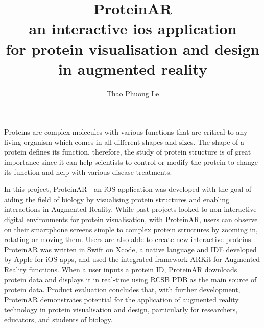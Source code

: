\documentclass[MSCIM]{mscim}
\begin{document}

\title{\textbf{ProteinAR} \\an interactive ios application\\for protein visualisation and design in augmented reality}

\author{Thao Phuong Le}

\beforeabstract

Proteins are complex molecules with various functions that are critical to any living organism which comes in all different shapes and sizes. The shape of a protein defines its function, therefore, the study of protein structure is of great importance since it can help scientists to control or modify the protein to change its function and help with various disease treatments. 

In this project, ProteinAR - an iOS application was developed with the goal of aiding the field of biology by visualising protein structures and enabling interactions in Augmented Reality. While past projects looked to non-interactive digital environments for protein visualisation, with ProteinAR, users can observe on their smartphone screens simple to complex protein structures by zooming in, rotating or moving them. Users are also able to create new interactive proteins. ProteinAR was written in Swift on Xcode, a native language and IDE developed by Apple for iOS apps, and used the integrated framework ARKit for Augmented Reality functions. When a user inputs a protein ID, ProteinAR downloads protein data and displays it in real-time using RCSB PDB as the main source of protein data. Product evaluation concludes that, with further development, ProteinAR demonstrates potential for the application of augmented reality technology in protein visualisation and design, particularly for researchers, educators, and students of biology.

\afterabstract



 
 
\afterpreface













\printbibliography

\end{document}
